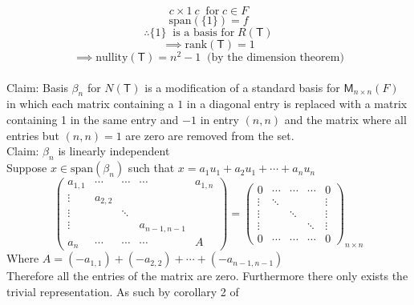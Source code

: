 \begin{enumerate}[(a)]
\begin{equation}
c\times 1\ c\;\;\text{for}\; c \in F
\end{equation}
\begin{equation}
\text{span}(\{1\}) = f
\end{equation}
\begin{equation}\label{onto}
\therefore \{1\}\;\;\text{is a basis for}\; R(\mathsf{T})
\end{equation}
\begin{equation}
\implies \text{rank}(\mathsf{T}) =1
\end{equation}
\begin{equation}
\implies \text{nullity}(\mathsf{T})=n^2 -1\;\;\text{(by the dimension theorem)}
\end{equation}
\\Claim: Basis $\beta_n$ for $N(\mathsf{T})$ is a modification of a standard
basis for $\mathsf{M}_{n\times n}(F)$ in which each matrix containing
a $1$ in a diagonal entry is replaced with a matrix containing 1 in the
same entry and $-1$ in entry $(n,n)$ and the matrix where all entries
but $(n,n)=1$ are zero are removed from the set.
\\Claim: $\beta_n$ is linearly independent 
\\Suppose $x \in \text{span}(\beta_n)$ such that
$x=a_1u_1+a_2u_1+\cdots+a_nu_n$
\begin{equation}
\begin{pmatrix}
a_{1,1} &\cdots & \cdots& \cdots& a_{1,n}\\
\vdots & a_{2,2}\\
\vdots &       & \ddots &\\
\vdots &       &        & a_{n-1,n-1}\\
a_n    & \cdots     &    \cdots   &   \cdots       & A
\end{pmatrix}
= \begin{pmatrix}
0 & \cdots & \cdots& \cdots& 0\\
\vdots & \ddots & & & \vdots\\
\vdots & & \ddots & & \vdots\\
\vdots & & & \ddots& \vdots\\
0 & \cdots & \cdots& \cdots& 0
\end{pmatrix}_{n\times n}
\end{equation}
Where $A= (-a_{1,1})+(-a_{2,2})+\cdots+(-a_{n-1,n-1})$
\\
Therefore all the entries of the matrix are zero. Furthermore there
only exists the trivial representation. As such by corollary 2 of

\end{enumerate}

